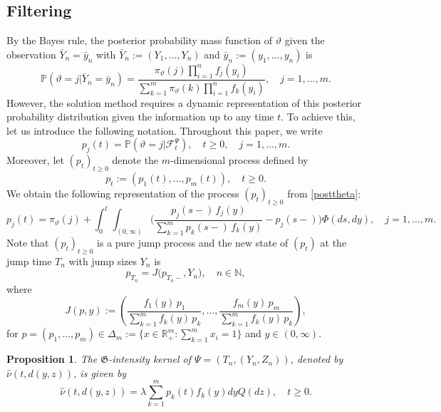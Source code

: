 \documentclass[reqno, 11pt]{amsart}%
\newcommand{\R}{\mathbb{R}}
\newcommand{\N}{\mathbb{N}}
\newcommand{\Pop}{\mathbb{P}}
\newtheorem{proposition}[theorem]{Proposition}
\theoremstyle{definition}
\numberwithin{equation}{section} \numberwithin{theorem}{section}
\begin{document}
\subsection{Filtering}
By the Bayes rule, the posterior probability mass function of $\vartheta$ given the observation $\bar{Y}_n=\bar{y}_n$ with $\bar{Y}_n:=(Y_1,\ldots,Y_n)$ and $\bar{y}_n:= (y_1,\ldots,y_n)$ is 
\begin{equation}\label{posttheta}
\Pop(\vartheta=j|\bar{Y}_n=\bar{y}_n) %
= \frac{\pi_\vartheta(j)\prod_{i=1}^n f_j(y_i)}{\sum_{k=1}^m\pi_\vartheta(k)\prod_{i=1}^n f_k(y_i)},\quad j=1,\ldots,m.
\end{equation}
However, the solution method requires a dynamic representation of this posterior probability distribution given the information up to any time $t$. To achieve this, let us introduce the following notation.
Throughout this paper, we write
\begin{equation*}
  p_j(t) = \Pop(\vartheta=j|\mathcal{F}_t^\Psi),\quad t\ge0,\quad j=1,\ldots,m.
\end{equation*}
Moreover, let $(p_t)_{t\ge0}$ denote the $m$-dimensional process defined by 
\begin{equation*}
  p_t:=(p_1(t),\ldots,p_m(t)),\quad t\ge0.
\end{equation*}
We obtain the following representation of the process $(p_t)_{t\ge0}$ from \eqref{posttheta}:
\begin{equation}\label{pj}
p_j(t) = \pi_\vartheta(j) + \int_0^t\int_{(0,\infty)}\bigg(\frac{p_j(s-)\,f_j(y)}{\sum_{k=1}^m p_k(s-)\,f_k(y)}-p_j(s-)\bigg)\Phi(ds,dy),\quad j=1,\ldots,m.
\end{equation}
Note that $(p_t)_{t\ge0}$ is a pure jump process and the new state of $(p_t)$ at the jump time $T_n$ with jump sizes $Y_n$ is 
\begin{equation*}
p_{T_n} = J\big(p_{T_n-},Y_n\big),\quad n\in\N,
\end{equation*}
where
\begin{equation*}
J(p,y) := \left(\frac{f_1(y)\, p_1}{\sum_{k=1}^m f_k(y)\,p_k},\ldots,\frac{f_m(y)\,p_m}{\sum_{k=1}^m f_k(y)\,p_k}\right),
\end{equation*}
for $p=(p_1,\ldots,p_m)\in\Delta_m:=\{x\in\R_+^m:\sum_{k=1}^m x_i=1\}$ and $y\in(0,\infty)$.

\begin{proposition}\label{GintkernelPsi}
	The ${\mathfrak G}$-intensity kernel of $\Psi=(T_n,(Y_n,Z_n))$, denoted by  $\hat{\nu}(t,d(y,z))$, is given by
	\begin{equation*}
	\hat{\nu}(t,d(y,z)) = \lambda\sum_{k=1}^m p_k(t)f_k(y)dyQ(dz),\quad t\ge0.
	\end{equation*}
\end{proposition}
\end{document}
